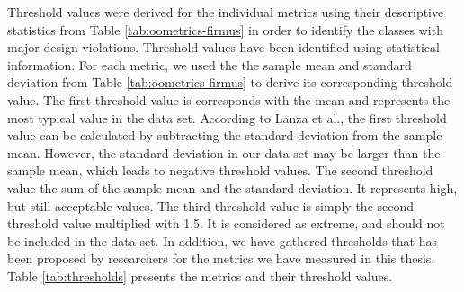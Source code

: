 Threshold values were derived for the individual metrics using their descriptive statistics from Table \ref{tab:oometrics-firmus} in order to identify the classes with major design violations. Threshold values have been identified using statistical information\cite{lanza2007object}. For each metric, we used the the sample mean and standard deviation from Table \ref{tab:oometrics-firmus} to derive its corresponding threshold value. The first threshold value is corresponds with the mean and represents the most typical value in the data set\cite{cais2014identifying}. According to Lanza et al.\cite{lanza2007object}, the first threshold value can be calculated by subtracting the standard deviation from the sample mean. However, the standard deviation in our data set may be larger than the sample mean, which leads to negative threshold values. The second threshold value the sum of the sample mean and the standard deviation. It represents high, but still acceptable values. The third threshold value is simply the second threshold value multiplied with 1.5\cite{lanza2007object}. It is considered as extreme, and should not be included in the data set. In addition, we have gathered thresholds that has been proposed by researchers for the metrics we have measured in this thesis. Table \ref{tab:thresholds} presents the metrics and their threshold values.

\begin{table}[ht!]
\end{table}



